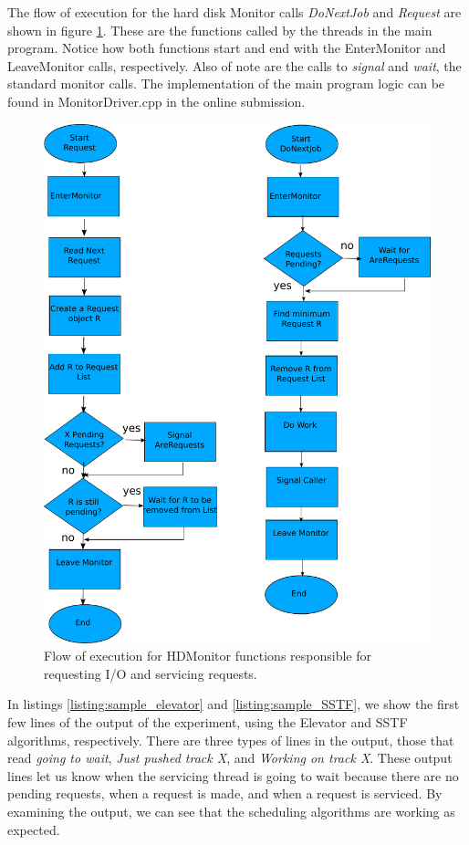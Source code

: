 \documentclass[12pt]{report}
\begin{document}
The flow of execution for the hard disk Monitor calls \emph{DoNextJob} and \emph{Request}
are shown in figure \ref{fig:flow}. These are the functions called by the threads in the
main program. Notice how both functions start and end with the EnterMonitor and
LeaveMonitor calls, respectively. Also of note are the calls to \emph{signal} and
\emph{wait}, the standard monitor calls. The implementation of the main program logic can
be found in MonitorDriver.cpp in the online submission.
\begin{figure}[htb!]
    \centering
    \includegraphics[scale=0.8]{300_flow.pdf}
    \caption{Flow of execution for HDMonitor functions responsible for requesting I/O and
    servicing requests.}
    \label{fig:flow}
\end{figure}

In listings \ref{listing:sample_elevator} and \ref{listing:sample_SSTF}, we show the
first few lines of the output of the experiment, using the Elevator and SSTF algorithms,
respectively. There are three types of lines in the output, those that read \emph{going to
wait}, \emph{Just pushed track X}, and \emph{Working on track X}. These output lines let
us know when the servicing thread is going to wait because there are no pending requests,
when a request is made, and when a request is serviced. By examining the output, we can
see that the scheduling algorithms are working as expected. 
\end{document}
